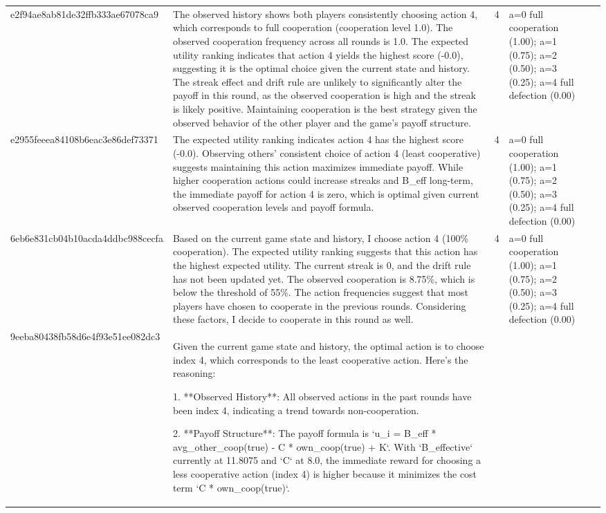 \begin{tabular}{lp{8cm}ll l}
e2f94ae8ab81de32ffb333ae67078ca9 & The observed history shows both players consistently choosing action 4, which corresponds to full cooperation (cooperation level 1.0). The observed cooperation frequency across all rounds is 1.0. The expected utility ranking indicates that action 4 yields the highest score (-0.0), suggesting it is the optimal choice given the current state and history. The streak effect and drift rule are unlikely to significantly alter the payoff in this round, as the observed cooperation is high and the streak is likely positive. Maintaining cooperation is the best strategy given the observed behavior of the other player and the game's payoff structure. & 4 & a=0 full cooperation (1.00); a=1 (0.75); a=2 (0.50); a=3 (0.25); a=4 full defection (0.00) &  \\
e2955feeea84108b6eac3e86def73371 & The expected utility ranking indicates action 4 has the highest score (-0.0). Observing others' consistent choice of action 4 (least cooperative) suggests maintaining this action maximizes immediate payoff. While higher cooperation actions could increase streaks and B\_eff long-term, the immediate payoff for action 4 is zero, which is optimal given current observed cooperation levels and payoff formula. & 4 & a=0 full cooperation (1.00); a=1 (0.75); a=2 (0.50); a=3 (0.25); a=4 full defection (0.00) &  \\
6eb6e831cb04b10acda4ddbc988cecfa & Based on the current game state and history, I choose action 4 (100\% cooperation). The expected utility ranking suggests that this action has the highest expected utility. The current streak is 0, and the drift rule has not been updated yet. The observed cooperation is 8.75\%, which is below the threshold of 55\%. The action frequencies suggest that most players have chosen to cooperate in the previous rounds. Considering these factors, I decide to cooperate in this round as well. & 4 & a=0 full cooperation (1.00); a=1 (0.75); a=2 (0.50); a=3 (0.25); a=4 full defection (0.00) &  \\
9eeba80438fb58d6e4f93e51ee082dc3 & Given the current game state and history, the optimal action is to choose index 4, which corresponds to the least cooperative action. Here's the reasoning:

1. **Observed History**: All observed actions in the past rounds have been index 4, indicating a trend towards non-cooperation.

2. **Payoff Structure**: The payoff formula is `u\_i = B\_eff * avg\_other\_coop(true) - C * own\_coop(true) + K`. With `B\_effective` currently at 11.8075 and `C` at 8.0, the immediate reward for choosing a less cooperative action (index 4) is higher because it minimizes the cost term `C * own\_coop(true)`.


\end{tabular}
